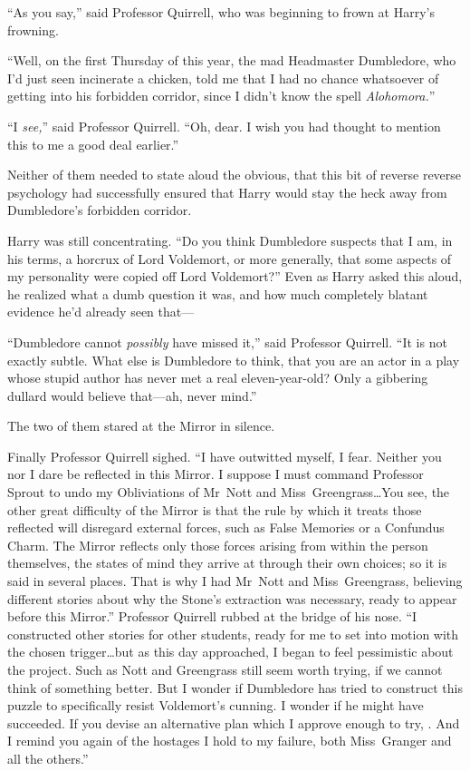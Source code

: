 “As you say,” said Professor Quirrell, who was beginning to frown at Harry’s frowning.

“Well, on the first Thursday of this year, the mad Headmaster Dumbledore, who I’d just seen incinerate a chicken, told me that I had no chance whatsoever of getting into his forbidden corridor, since I didn’t know the spell \emph{Alohomora.}”

“I \emph{see,}” said Professor Quirrell. “Oh, dear. I wish you had thought to mention this to me a good deal earlier.”

Neither of them needed to state aloud the obvious, that this bit of reverse reverse psychology had successfully ensured that Harry would stay the heck away from Dumbledore’s forbidden corridor.

Harry was still concentrating. “Do you think Dumbledore suspects that I am, in his terms, a horcrux of Lord Voldemort, or more generally, that some aspects of my personality were copied off Lord Voldemort?” Even as Harry asked this aloud, he realized what a dumb question it was, and how much completely blatant evidence he’d already seen that—

“Dumbledore cannot \emph{possibly} have missed it,” said Professor Quirrell. “It is not exactly subtle. What else is Dumbledore to think, that you are an actor in a play whose stupid author has never met a real eleven-year-old? Only a gibbering dullard would believe that—ah, never mind.”

The two of them stared at the Mirror in silence.

Finally Professor Quirrell sighed. “I have outwitted myself, I fear. Neither you nor I dare be reflected in this Mirror. I suppose I must command Professor Sprout to undo my Obliviations of Mr~Nott and Miss~Greengrass…You see, the other great difficulty of the Mirror is that the rule by which it treats those reflected will disregard external forces, such as False Memories or a Confundus Charm. The Mirror reflects only those forces arising from within the person themselves, the states of mind they arrive at through their own choices; so it is said in several places. That is why I had Mr~Nott and Miss~Greengrass, believing different stories about why the Stone’s extraction was necessary, ready to appear before this Mirror.” Professor Quirrell rubbed at the bridge of his nose. “I constructed other stories for other students, ready for me to set into motion with the chosen trigger…but as this day approached, I began to feel pessimistic about the project. Such as Nott and Greengrass still seem worth trying, if we cannot think of something better. But I wonder if Dumbledore has tried to construct this puzzle to specifically resist Voldemort’s cunning. I wonder if he might have succeeded. If you devise an alternative plan which I approve enough to try, . And I remind you again of the hostages I hold to my failure, both Miss~Granger and all the others.”

